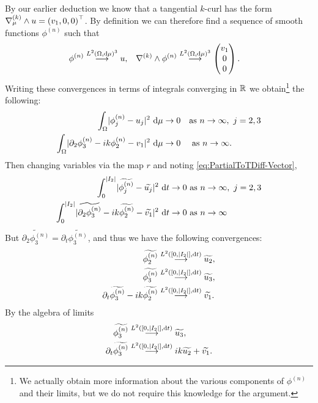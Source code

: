 By our earlier deduction we know that a tangential $k$-curl has the form $\nabla_{\mu}^{(k)}\wedge u=\left( v_1,0,0 \right)^{\top}$.
By definition we can therefore find a sequence of smooth functions $\phi^{(n)}$ such that 
\begin{align*}
	\phi^{(n)} \overset{L^{2}\left( \Omega,\mathrm{d}\mu \right)^3}{\longrightarrow} u,
	&\quad \nabla_{}^{(k)}\wedge\phi^{(n)} \overset{L^{2}\left( \Omega,\mathrm{d}\mu \right)^3}{\longrightarrow} \begin{pmatrix} v_1 \\ 0 \\ 0 \end{pmatrix}.
\end{align*}
Writing these convergences in terms of integrals converging in $\mathbb{R}$ we obtain\footnote{We actually obtain more information about the various components of $\phi^{(n)}$ and their limits, but we do not require this knowledge for the argument.} the following:
\begin{align*}
	\int_{\Omega}\lvert \phi_j^{(n)}-u_j \rvert^2 \ \mathrm{d}\mu &\rightarrow 0 \quad\text{as} \ n\rightarrow\infty, \ j=2,3\\
	\int_{\Omega}\lvert \partial_2\phi_3^{(n)}-ik\phi_2^{(n)}-v_1 \rvert^2 \ \mathrm{d}\mu &\rightarrow 0 \quad \ \text{as} \ n \rightarrow\infty.
\end{align*}
Then changing variables via the map $r$ and noting \eqref{eq:PartialToTDiff-Vector},
\begin{align*}
	\int_0^{\lvert I_2 \rvert}\lvert \widetilde{\phi_j^{(n)}}-\widetilde{u_j} \rvert^2 \ \mathrm{d} t \rightarrow 0 &\ \text{as} \ n \rightarrow\infty, \ j =2,3 \\
	\int_0^{\lvert I_2 \rvert}\lvert \widetilde{\partial_2\phi_3^{(n)}}-ik\widetilde{\phi_2^{(n)}}-\widetilde{v_1} \rvert^2 \ \mathrm{d} t \rightarrow0 &\ \text{as} \ n \rightarrow\infty
\end{align*}
But $\widetilde{\partial_2\phi_3^{(n)}} = \partial_t\widetilde{\phi_3^{(n)}}$, and thus we have the following convergences:
\begin{align*}
	\widetilde{\phi_2^{(n)}} &\overset{L^{2}\left( \left[ 0,\lvert I_2 \rvert \right],\mathrm{d}t \right)}{\longrightarrow} \widetilde{u_2}, \\
	\widetilde{\phi_3^{(n)}} &\overset{L^{2}\left( \left[ 0,\lvert I_2 \rvert \right],\mathrm{d}t \right)}{\longrightarrow} \widetilde{u_3}, \\
	\partial_t\widetilde{\phi_3^{(n)}}-ik\widetilde{\phi_2^{(n)}} &\overset{L^{2}\left( \left[ 0,\lvert I_2 \rvert \right],\mathrm{d}t \right)}{\longrightarrow} \widetilde{v_1}.
\end{align*}
By the algebra of limits
\begin{align*}
	\widetilde{\phi_3^{(n)}} &\overset{L^{2}\left( \left[ 0,\lvert I_2 \rvert \right],\mathrm{d}t \right)}{\longrightarrow} \widetilde{u_3}, \\
	\partial_t\widetilde{\phi_3^{(n)}} &\overset{L^{2}\left( \left[ 0,\lvert I_2 \rvert \right],\mathrm{d}t \right)}{\longrightarrow} ik\widetilde{u_2} + \widetilde{v_1}.
\end{align*}
